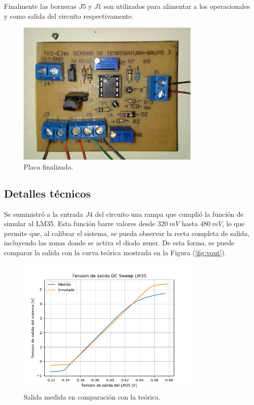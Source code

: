 Finalmente las borneras $J5$ y $J1$ son utilizados para alimentar a los operacionales y como salida del circuito respectivamente.

\begin{figure}[H]
	\centering
	\includegraphics[width=0.8\textwidth]{Ejercicio6/Imagenes/SDT-TCG3.jpg}
	\caption{Placa finalizada.}
	\label{fig:placa}
\end{figure}

\subsection{Detalles técnicos}
Se suministró a la entrada $J4$ del circuito una rampa que cumplió la función de simular al LM35. Esta función barre valores desde $320 \ mV$ hasta $480 \ mV$, lo que permite que, al calibrar el sistema, se pueda observar la recta completa de salida, incluyendo las zonas donde se activa el diodo zener. De esta forma, se puede comparar la salida con la curva teórica mostrada en la Figura (\ref{fig:vout}).

\begin{figure}[H]
	\centering
	\includegraphics[width=0.8\textwidth]{Ejercicio6/Imagenes/Teovsmed.png}
	\caption{Salida medida en comparación con la teórica.}
	\label{fig:comp1}
\end{figure}

